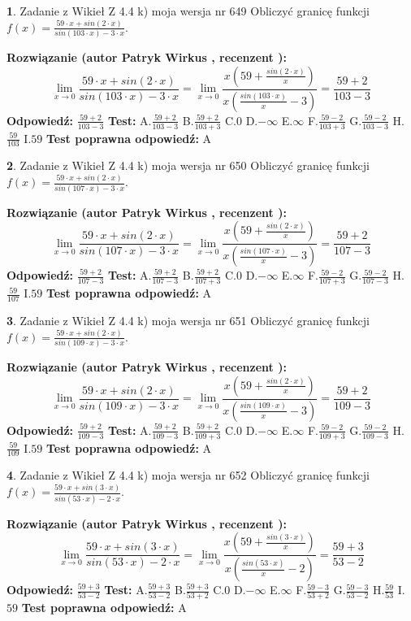 \documentclass[12pt, a4paper]{article}
\theoremstyle{definition} %
\newtheorem{zad}{}
\newcommand{\zadStart}[1]{\begin{zad}#1\newline}
\newcommand{\zadStop}{\end{zad}}
\newcommand{\rozwStart}[2]{\noindent \textbf{Rozwiązanie (autor #1 , recenzent #2): }\newline}
\newcommand{\rozwStop}{\newline}
\newcommand{\odpStart}{\noindent \textbf{Odpowiedź:}\newline}
\newcommand{\odpStop}{\newline}
\newcommand{\testStart}{\noindent \textbf{Test:}\newline}
\newcommand{\testStop}{\newline}
\newcommand{\kluczStart}{\noindent \textbf{Test poprawna odpowiedź:}\newline}
\newcommand{\kluczStop}{\newline}
\begin{document}
\zadStart{Zadanie z Wikieł Z 4.4 k) moja wersja nr 649}
Obliczyć granicę funkcji $f(x)=\frac{59\cdot x +sin(2\cdot x)}{sin(103\cdot x) -3\cdot x}$.
\zadStop
\rozwStart{Patryk Wirkus}{}
$$\lim\limits_{x\to 0}\frac{59\cdot x +sin(2\cdot x)}{sin(103\cdot x) -3\cdot x}
=\lim\limits_{x\to 0}\frac{x(59+\frac{sin(2\cdot x)}{x})}{x(\frac{sin(103\cdot x)}{x}-3)}
=\frac{59+2}{103-3}$$
\rozwStop
\odpStart
$\frac{59+2}{103-3}$
\odpStop
\testStart
A.$\frac{59+2}{103-3}$
B.$\frac{59+2}{103+3}$
C.$0$
D.$-\infty$
E.$\infty$
F.$\frac{59-2}{103+3}$
G.$\frac{59-2}{103-3}$
H.$\frac{59}{103}$
I.$59$
\testStop
\kluczStart
A
\kluczStop



\zadStart{Zadanie z Wikieł Z 4.4 k) moja wersja nr 650}
Obliczyć granicę funkcji $f(x)=\frac{59\cdot x +sin(2\cdot x)}{sin(107\cdot x) -3\cdot x}$.
\zadStop
\rozwStart{Patryk Wirkus}{}
$$\lim\limits_{x\to 0}\frac{59\cdot x +sin(2\cdot x)}{sin(107\cdot x) -3\cdot x}
=\lim\limits_{x\to 0}\frac{x(59+\frac{sin(2\cdot x)}{x})}{x(\frac{sin(107\cdot x)}{x}-3)}
=\frac{59+2}{107-3}$$
\rozwStop
\odpStart
$\frac{59+2}{107-3}$
\odpStop
\testStart
A.$\frac{59+2}{107-3}$
B.$\frac{59+2}{107+3}$
C.$0$
D.$-\infty$
E.$\infty$
F.$\frac{59-2}{107+3}$
G.$\frac{59-2}{107-3}$
H.$\frac{59}{107}$
I.$59$
\testStop
\kluczStart
A
\kluczStop



\zadStart{Zadanie z Wikieł Z 4.4 k) moja wersja nr 651}
Obliczyć granicę funkcji $f(x)=\frac{59\cdot x +sin(2\cdot x)}{sin(109\cdot x) -3\cdot x}$.
\zadStop
\rozwStart{Patryk Wirkus}{}
$$\lim\limits_{x\to 0}\frac{59\cdot x +sin(2\cdot x)}{sin(109\cdot x) -3\cdot x}
=\lim\limits_{x\to 0}\frac{x(59+\frac{sin(2\cdot x)}{x})}{x(\frac{sin(109\cdot x)}{x}-3)}
=\frac{59+2}{109-3}$$
\rozwStop
\odpStart
$\frac{59+2}{109-3}$
\odpStop
\testStart
A.$\frac{59+2}{109-3}$
B.$\frac{59+2}{109+3}$
C.$0$
D.$-\infty$
E.$\infty$
F.$\frac{59-2}{109+3}$
G.$\frac{59-2}{109-3}$
H.$\frac{59}{109}$
I.$59$
\testStop
\kluczStart
A
\kluczStop



\zadStart{Zadanie z Wikieł Z 4.4 k) moja wersja nr 652}
Obliczyć granicę funkcji $f(x)=\frac{59\cdot x +sin(3\cdot x)}{sin(53\cdot x) -2\cdot x}$.
\zadStop
\rozwStart{Patryk Wirkus}{}
$$\lim\limits_{x\to 0}\frac{59\cdot x +sin(3\cdot x)}{sin(53\cdot x) -2\cdot x}
=\lim\limits_{x\to 0}\frac{x(59+\frac{sin(3\cdot x)}{x})}{x(\frac{sin(53\cdot x)}{x}-2)}
=\frac{59+3}{53-2}$$
\rozwStop
\odpStart
$\frac{59+3}{53-2}$
\odpStop
\testStart
A.$\frac{59+3}{53-2}$
B.$\frac{59+3}{53+2}$
C.$0$
D.$-\infty$
E.$\infty$
F.$\frac{59-3}{53+2}$
G.$\frac{59-3}{53-2}$
H.$\frac{59}{53}$
I.$59$
\testStop
\kluczStart
A
\kluczStop
\end{document}
